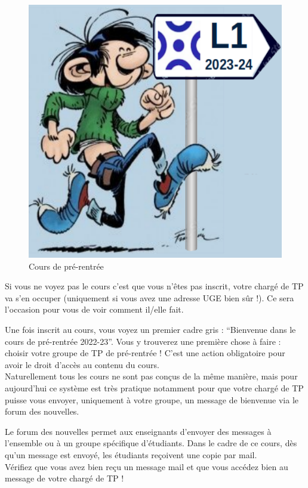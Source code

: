 \documentclass{article}
\begin{document}
\begin{exercice}
\begin{figure}[h!]
    \begin{center}
    \includegraphics[scale=0.3]{Logo_2023-24.png}
    \caption{Cours de pré-rentrée}
     \end{center}
\end{figure}    

Si vous ne voyez pas le cours c'est que vous n'êtes pas inscrit, votre chargé de TP va s'en occuper (uniquement si vous avez une adresse UGE bien sûr !). Ce sera l'occasion pour vous de voir comment il/elle fait.

\medskip

Une fois inscrit au cours, vous voyez un premier cadre gris : ``Bienvenue dans le cours de pré-rentrée 2022-23''. Vous y trouverez une première chose à faire : choisir votre groupe de TP de pré-rentrée !
C'est une action obligatoire pour avoir le droit d'accès au contenu du cours. \\
Naturellement tous les cours ne sont pas con\c cus de la même manière, mais pour aujourd'hui ce système est très pratique notamment pour que votre chargé de TP puisse vous envoyer, uniquement à votre groupe, un message de bienvenue via le forum des nouvelles.

\medskip

Le forum des nouvelles permet aux enseignants d'envoyer des messages à l'ensemble ou à un groupe spécifique d'étudiants. Dans le cadre de ce cours, dès qu'un message est envoyé, les étudiants re\c coivent une copie par mail. \\
Vérifiez que vous avez bien re\c cu un message mail et que vous accédez bien au message de votre chargé de TP !
 

\end{exercice}
\end{document}
